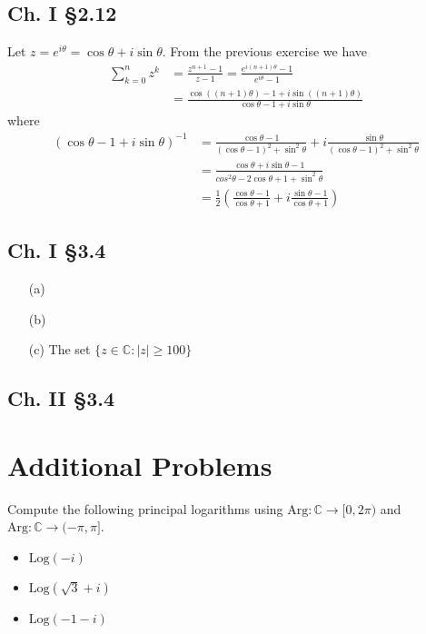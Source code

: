 \documentclass{article}
\newcounter{Problem}
\newenvironment{Problem}{\begin{Exercise}[name={Problem},
                                          counter={Problem}]}
                        {\end{Exercise}}
\begin{document}
\subsection*{Ch. I \S 2.12}
Let $z = e^{i \theta} = \cos \theta + i \sin \theta$. From the
previous exercise we have
\begin{align*}
   \sum_{k=0}^n z^k
&= \frac{z^{n+1} - 1}{z - 1}
 = \frac{e^{i(n+1)\theta} - 1}{e^{i\theta} - 1} \\
&= \frac{\cos ((n+1)\theta) - 1 + i \sin ((n+1)\theta)}
        {\cos \theta -  1 + i \sin \theta}
\end{align*}
where
\begin{align*}
   (\cos \theta - 1 + i \sin \theta)^{-1}
&= \frac{\cos \theta - 1}
        {(\cos \theta - 1)^2 + \sin^2 \theta}
 + i\frac{\sin \theta}
        {(\cos \theta - 1)^2 + \sin^2 \theta} \\
&= \frac{\cos \theta + i \sin \theta - 1}
        {cos^2 \theta - 2 \cos \theta + 1 + \sin^2 \theta} \\
&= \frac{1}{2}\left(
        \frac{\cos \theta - 1}
             {\cos \theta + 1}
   +   i\frac{\sin \theta - 1}
             {\cos \theta + 1}
   \right)
\end{align*}

\subsection*{Ch. I \S 3.4}
\begin{itemize}
  \item[(a)]{
  }
  \item[(b)]{
  }
  \item[(c)]{
    The set $\{ z \in \mathbb{C} : |z| \geq 100 \}$
  }
\end{itemize}

\subsection*{Ch. II \S 3.4}

\section{Additional Problems}

\begin{Problem}
Compute the following principal logarithms using
$\mathrm{Arg} : \mathbb{C} \to [0, 2\pi)$ and
$\mathrm{Arg} : \mathbb{C} \to (-\pi, \pi]$.
\begin{itemize}
  \item{
    $\mathrm{Log}(-i)$
  }
  \item{
    $\mathrm{Log}(\sqrt{3} + i)$
  }
  \item{
    $\mathrm{Log}(-1 - i)$
  }
\end{itemize}
\end{Problem}
\end{document}
